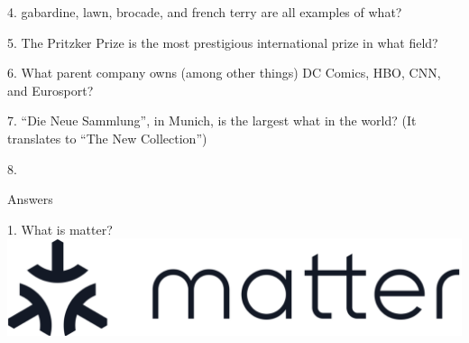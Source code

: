 \begin{frame}
\begin{center}
\Large
4. gabardine, lawn, brocade, and french terry are all examples of what?
\end{center}
\end{frame}
\begin{frame}
\begin{center}
\Large
5. The Pritzker Prize is the most prestigious international prize in what field?
\end{center}
\end{frame}
\begin{frame}
\begin{center}
\Large
6. What parent company owns (among other things) DC Comics, HBO, CNN, and Eurosport?
\end{center}
\end{frame}
\begin{frame}
\begin{center}
\Large
7. ``Die Neue Sammlung'', in Munich, is the largest what in the world? (It translates to ``The New Collection'')
\end{center}
\end{frame}
\begin{frame}
\begin{center}
\Large
8. 
\end{center}
\end{frame}
\begin{frame}
\begin{center}
\Huge
Answers
\end{center}
\end{frame}
\begin{frame}
\begin{center}
\Large
1. What is matter?
\\
\vspace{0.5em}\includegraphics[height=0.25\paperheight]{images/matter.png}
\\
\end{center}
\end{frame}
